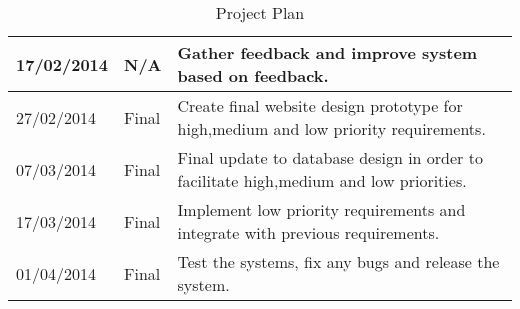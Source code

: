 \documentclass[a4paper,oneside,11pt]{report}
\begin{document}
\begin{center}
\begin{table}[!ht]
\begin{tabular}[ht]{| l | l | p{11cm} |}
    \hline
    17/02/2014 & N/A & Gather feedback and improve system based on feedback.\\
    \hline
    27/02/2014 & Final & Create final website design prototype for high,medium and low priority 			 			 requirements.\\
    \hline
    07/03/2014 & Final & Final update to database design in order to facilitate high,medium and low		 		             priorities.\\
    \hline
    17/03/2014 & Final & Implement low priority requirements and integrate with previous requirements.\\
    \hline
    01/04/2014 & Final & Test the systems, fix any bugs and release the system.\\
    \hline
    \end{tabular}
    \caption{Project Plan}
\label{tab:test}
    \end{table}
    \end{center}

\printbibliography
\end{document}
